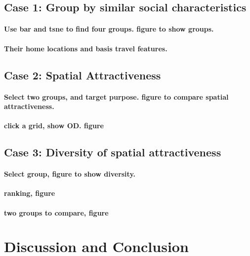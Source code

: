 \subsection{Case 1: Group by similar social characteristics}
\paragraph{Use bar and tsne to find four groups. figure to show groups.}
\paragraph{Their home locations and basis travel features.}


\subsection{Case 2: Spatial Attractiveness}
\paragraph{Select two groups, and target purpose. figure to compare spatial attractiveness.}
\paragraph{click a grid, show OD. figure}


\subsection{Case 3: Diversity of spatial attractiveness}
\paragraph{Select group, figure to show diversity.}
\paragraph{ranking, figure}
\paragraph{two groups to compare, figure}


\section{Discussion and Conclusion}






%




